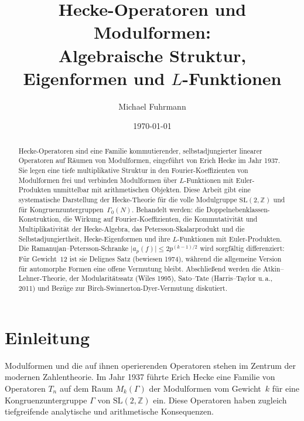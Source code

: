 \documentclass[12pt,a4paper]{amsart}
\author{Michael Fuhrmann}
\date{\today}
\theoremstyle{definition}
\begin{document}
\title{Hecke-Operatoren und Modulformen:\\
Algebraische Struktur, Eigenformen und $L$-Funktionen}

\begin{abstract}
Hecke-Operatoren sind eine Familie kommutierender, selbstadjungierter linearer
Operatoren auf R\"aumen von Modulformen, eingef\"uhrt von Erich Hecke im Jahr
1937. Sie legen eine tiefe multiplikative Struktur in den Fourier-Koeffizienten
von Modulformen frei und verbinden Modulformen \"uber $L$-Funktionen mit
Euler-Produkten unmittelbar mit arithmetischen Objekten. Diese Arbeit gibt
eine systematische Darstellung der Hecke-Theorie f\"ur die volle Modulgruppe
$\mathrm{SL}(2,\mathbb{Z})$ und f\"ur Kongruenzuntergruppen~$\Gamma_0(N)$.
Behandelt werden: die Doppelnebenklassen-Konstruktion, die Wirkung auf
Fourier-Koeffizienten, die Kommutativit\"at und Multiplikativit\"at der
Hecke-Algebra, das Petersson-Skalarprodukt und die Selbstadjungiertheit,
Hecke-Eigenformen und ihre $L$-Funktionen mit Euler-Produkten. Die
Ramanujan--Petersson-Schranke $\lvert a_p(f)\rvert \le 2p^{(k-1)/2}$ wird
sorgf\"altig differenziert: F\"ur Gewicht~$12$ ist sie Delignes Satz (bewiesen
1974), w\"ahrend die allgemeine Version f\"ur automorphe Formen eine offene
Vermutung bleibt. Abschlie{\ss}end werden die Atkin--Lehner-Theorie, der
Modularit\"atssatz (Wiles 1995), Sato--Tate (Harris--Taylor u.\,a., 2011)
und Bez\"uge zur Birch-Swinnerton-Dyer-Vermutung diskutiert.
\end{abstract}

\maketitle

\tableofcontents

\section{Einleitung}

Modulformen und die auf ihnen operierenden Operatoren stehen im Zentrum der
modernen Zahlentheorie. Im Jahr 1937 f\"uhrte Erich Hecke eine Familie von
Operatoren $T_n$ auf dem Raum $M_k(\Gamma)$ der Modulformen vom Gewicht~$k$
f\"ur eine Kongruenzuntergruppe $\Gamma$ von $\mathrm{SL}(2,\mathbb{Z})$ ein.
Diese Operatoren haben zugleich tiefgreifende analytische und arithmetische
Konsequenzen.
\end{document}
